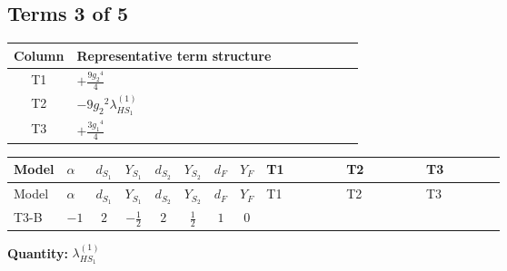 \documentclass[8pt]{article}
\begin{document}
\begin{landscape}
\subsection*{Terms 3 of 5}
\begin{center}
\begin{tabular}{@{}c >{\raggedright\arraybackslash}p{0.82\linewidth}@{}}
\toprule
Column & Representative term structure \\
\midrule
T1 & \(\displaystyle +\frac{9 {g_2}^4}{4}\) \\
\midrule
T2 & \(\displaystyle -9 {g_2}^2 {\lambda_{HS_1}^{(1)}}\) \\
\midrule
T3 & \(\displaystyle +\frac{3 {g_1}^4}{4}\) \\
\midrule
\bottomrule
\end{tabular}
\end{center}
\smallskip
\tiny
\begin{longtable}{@{}llcccccc >{\raggedright\arraybackslash}p{0.21\linewidth} >{\raggedright\arraybackslash}p{0.21\linewidth} >{\raggedright\arraybackslash}p{0.21\linewidth}@{}}
\toprule
Model & $\alpha$ & $d_{S_1}$ & $Y_{S_1}$ & $d_{S_2}$ & $Y_{S_2}$ & $d_F$ & $Y_F$ & T1 & T2 & T3 \\
\midrule
\endfirsthead
\toprule
Model & $\alpha$ & $d_{S_1}$ & $Y_{S_1}$ & $d_{S_2}$ & $Y_{S_2}$ & $d_F$ & $Y_F$ & T1 & T2 & T3 \\
\midrule
\endhead
T3-B & $-1$ & $2$ & $-\frac{1}{2}$ & $2$ & $\frac{1}{2}$ & $1$ & $0$ & \scriptsize\adjustbox{max width=\linewidth}{$\begin{gathered} +\frac{9 {g_2}^4}{4}\end{gathered}$} & \scriptsize\adjustbox{max width=\linewidth}{$\begin{gathered} -9 {g_2}^2 {\lambda_{HS_1}^{(1)}}\end{gathered}$} & \scriptsize\adjustbox{max width=\linewidth}{$\begin{gathered} +\frac{3 {g_1}^4}{4}\end{gathered}$} \\
\midrule
\bottomrule
\end{longtable}
\clearpage
\noindent\textbf{Quantity: }$\lambda_{HS_1}^{(1)}$\par\smallskip

\end{landscape}
\end{document}
